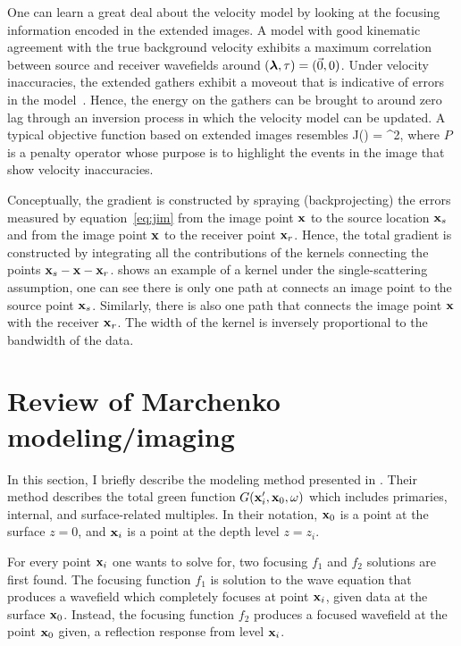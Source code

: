 One can learn a great deal about the velocity model by looking at the focusing information
encoded in the extended images. A model with good kinematic agreement with 
the true background velocity exhibits 
a maximum correlation between source and receiver wavefields around $({\boldsymbol{\lambda}},\tau)=(\vec{0},0)$. Under velocity 
inaccuracies, the
extended gathers exhibit a moveout that is indicative of 
 errors in the model~\citep{YangSava:moveout}. Hence,
 the energy on the gathers can be brought to around zero lag through an
inversion process in which the velocity model can be updated. A typical 
objective function \citep{ShenSymes.geo.2008,Wiktor,tony:gp15} based on 
extended images resembles 
\beq
 J(\m) = ^2,
\label{eq:jim}
\eeq
where $P$ is a penalty operator whose purpose is to 
highlight the events in the image that show velocity inaccuracies. 

Conceptually, the gradient is constructed by spraying (backprojecting) the errors measured by equation~\ref{eq:jim}
from the image point ${\bf x}$ to the source location ${\bf x}_s$ and from the image point ${\bf x}$ to the receiver
point ${\bf x}_r$. Hence, the total gradient is constructed by integrating all the contributions of the 
kernels connecting the points ${\bf x}_s-{\bf x}-{\bf x}_r$.   shows an example of 
a kernel under the single-scattering assumption, one can see there is only one path
at connects an image point to the source point ${\bf x}_s$. Similarly, there is also one path
that connects the image point ${\bf x}$ with the receiver ${\bf x}_r$. The width of the kernel is inversely proportional
to the bandwidth of the data. 


\section{Review of Marchenko modeling/imaging}
In this section, I briefly describe the modeling method presented in \cite{Singh2015}. Their method
describes the total green function $G({\bf x}_i',{\bf x}_0,\omega)$ which includes
primaries, internal, and surface-related multiples. In their notation, ${\bf x}_0$ is a point at the surface $z=0$, and
${\bf x}_i$ is a point at the depth level $z= z_i$.

For every point ${\bf x}_i$ one wants to solve for, two focusing $f_1$ and $f_2$ solutions are first found. 
The focusing function $f_1$ is solution to the wave equation that produces a wavefield which completely 
focuses at point ${\bf x}_i$, given data at the surface ${\bf x}_0$. Instead, the focusing function
 $f_2$ produces a focused wavefield at the point ${\bf x}_0$ given, a reflection response 
from level ${\bf x}_i$. 

